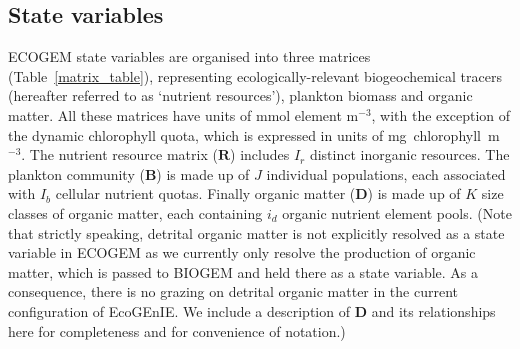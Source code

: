 \documentclass[gmd, manuscript]{copernicus}
\begin{document}

\subsection{State variables}\label{StateVariables}

ECOGEM state variables are organised into three matrices (Table~\ref{matrix_table}), representing ecologically-relevant biogeochemical tracers (hereafter referred to as `nutrient resources'), plankton biomass and organic matter. All these matrices have units of mmol element m$^{-3}$, with the exception of the dynamic chlorophyll quota, which is expressed in units of mg~chlorophyll~m$^{-3}$. The nutrient resource matrix ($\mathbf{R}$) includes $I_r$ distinct inorganic resources. The plankton community ($\mathbf{B}$) is made up of $J$ individual populations, each associated with $I_b$ cellular nutrient quotas. Finally organic matter ($\mathbf{D}$) is made up of $K$ size classes of organic matter, each containing $i_d$ organic nutrient element pools. (Note that strictly speaking, detrital organic matter is not explicitly resolved as a state variable in ECOGEM as we currently only resolve the production of organic matter, which is passed to BIOGEM and held there as a state variable.  As a consequence, there is no grazing on detrital organic matter in the current configuration of EcoGEnIE. We include  a description of $\mathbf{D}$ and its relationships here for completeness and for convenience of notation.)

\end{document}

